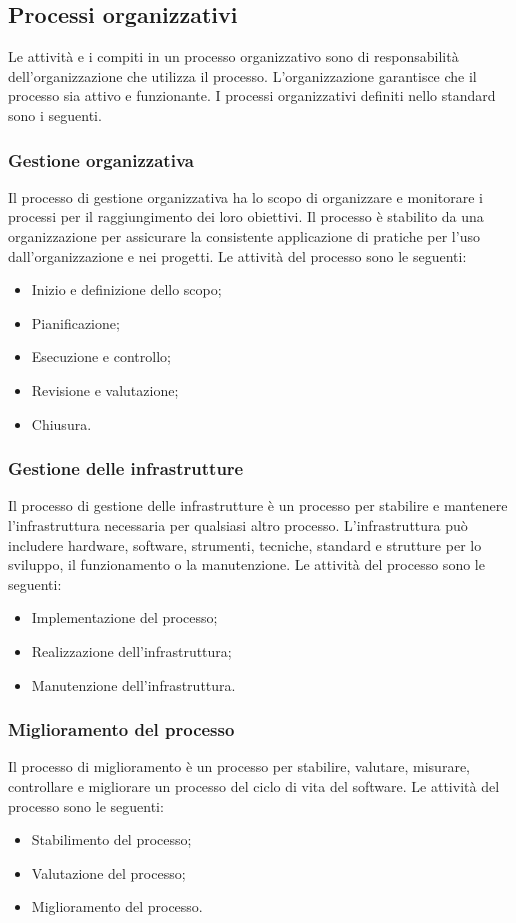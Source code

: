 \subsection{Processi organizzativi}
Le attività e i compiti in un processo organizzativo sono di responsabilità dell'organizzazione che utilizza il processo. L'organizzazione garantisce che il processo sia attivo e funzionante.
I processi organizzativi definiti nello standard sono i seguenti.

\subsubsection{Gestione organizzativa}
Il processo di gestione organizzativa ha lo scopo di organizzare e monitorare i processi per il raggiungimento dei loro obiettivi. Il processo è stabilito da una organizzazione per assicurare la consistente applicazione di pratiche per l'uso dall'organizzazione e nei progetti.
Le attività del processo sono le seguenti:
\begin{itemize}
\item Inizio e definizione dello scopo;
\item Pianificazione;
\item Esecuzione e controllo;
\item Revisione e valutazione;
\item Chiusura.
\end{itemize}
\subsubsection{Gestione delle infrastrutture}
Il processo di gestione delle infrastrutture è un processo per stabilire e mantenere l'infrastruttura necessaria per qualsiasi altro processo. L'infrastruttura può includere hardware, software, strumenti, tecniche, standard e strutture per lo sviluppo, il funzionamento o la manutenzione.
Le attività del processo sono le seguenti:
\begin{itemize}
\item Implementazione del processo;
\item Realizzazione dell'infrastruttura;
\item Manutenzione dell'infrastruttura.
\end{itemize}

\subsubsection{Miglioramento del processo}
Il processo di miglioramento è un processo per stabilire, valutare, misurare, controllare e migliorare un processo del ciclo di vita del software.
Le attività del processo sono le seguenti:
\begin{itemize}
\item Stabilimento del processo;
\item Valutazione del processo;
\item Miglioramento del processo.
\end{itemize}

